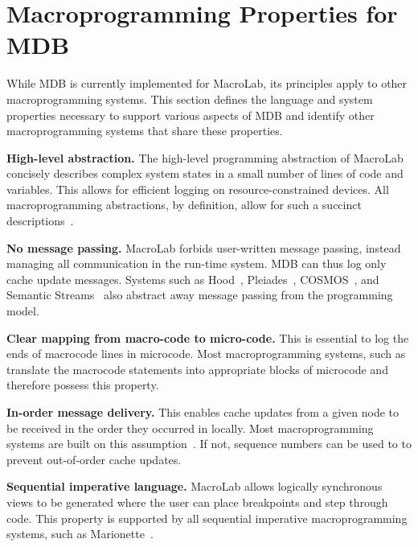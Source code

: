 \section{Macroprogramming Properties for MDB} \label{language}

While MDB is currently implemented for MacroLab, its principles apply to other
macroprogramming systems. This section defines the language and system
properties necessary to support various aspects of MDB and identify other
macroprogramming systems that share these properties.

\par{\bf High-level abstraction. } The high-level programming abstraction of
  MacroLab concisely describes complex system states in a small number
  of lines of code and variables. This allows for efficient logging on
  resource-constrained devices. All macroprogramming abstractions, by
  definition, allow for such a succinct
  descriptions~\cite{Mainland2008,Newton2004,Welsh2004,Kothari,Greenstein2004}.  

\par {\bf No message passing. } MacroLab forbids user-written
  message passing, instead managing all communication in the
  run-time system. MDB can thus log only cache update messages.  
  Systems such as Hood~\cite{Whitehousea}, Pleiades~\cite{Kothari},
  COSMOS~\cite{Awan2007}, and Semantic Streams~\cite{Whitehouse} also abstract away
  message passing from the programming model.

\par {\bf Clear mapping from macro-code to micro-code. } This is
essential to log the ends of macrocode lines in microcode. Most
macroprogramming systems, such as~\cite{Kothari} translate the
macrocode statements into appropriate blocks of microcode and
therefore possess this property.

\par {\bf In-order message delivery. } This enables cache updates from a
  given node to be received in the order they occurred in locally. Most
  macroprogramming systems are built on this assumption~\cite{Birman1994}. If
  not, sequence numbers can be used to to prevent out-of-order cache
  updates. 

\par {\bf Sequential imperative language. } 
  MacroLab allows logically synchronous views to be generated where the
  user can place breakpoints and step through code. This property is
  supported by all sequential imperative macroprogramming systems, such as
  Marionette~\cite{Whitehouseb}. 

